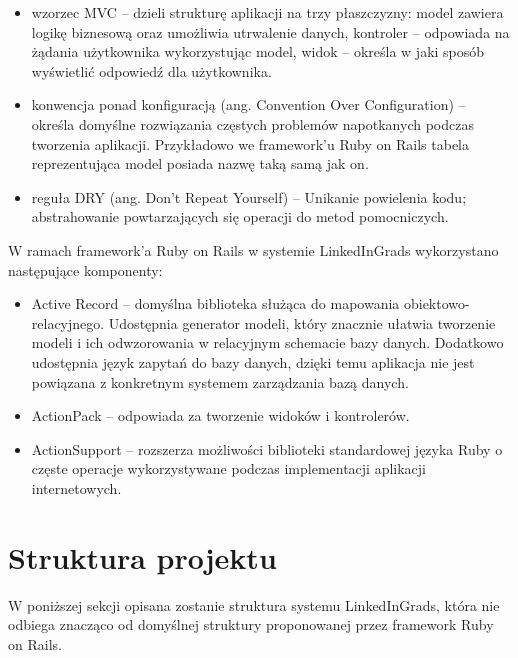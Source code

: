 \begin{itemize}
\item wzorzec MVC – dzieli strukturę aplikacji na trzy płaszczyzny: model zawiera logikę biznesową oraz umożliwia utrwalenie danych, kontroler – odpowiada na żądania użytkownika wykorzystując model, widok – określa w jaki sposób wyświetlić odpowiedź dla użytkownika.
\item konwencja ponad konfiguracją (ang. Convention Over Configuration) – określa domyślne rozwiązania częstych problemów napotkanych podczas tworzenia aplikacji. Przykładowo we framework’u Ruby on Rails tabela reprezentująca model posiada nazwę taką samą jak on.
\item reguła DRY (ang. Don't Repeat Yourself) – Unikanie powielenia kodu; abstrahowanie powtarzających się operacji do metod pomocniczych.
\end{itemize}

W ramach framework'a Ruby on Rails w systemie LinkedInGrads wykorzystano następujące komponenty:

\begin{itemize}
\item Active Record – domyślna biblioteka służąca do mapowania obiektowo-relacyjnego. Udostępnia generator modeli, który znacznie ułatwia tworzenie modeli i ich odwzorowania w relacyjnym schemacie bazy danych. Dodatkowo udostępnia język zapytań do bazy danych, dzięki temu aplikacja nie jest powiązana z konkretnym systemem zarządzania bazą danych.
\item ActionPack – odpowiada za tworzenie widoków i kontrolerów.
\item ActionSupport – rozszerza możliwości biblioteki standardowej języka Ruby o częste operacje wykorzystywane podczas implementacji aplikacji internetowych.
\end{itemize}

\section{Struktura projektu}

W poniższej sekcji opisana zostanie struktura systemu LinkedInGrads, która nie odbiega znacząco od domyślnej struktury proponowanej przez framework Ruby on Rails.

